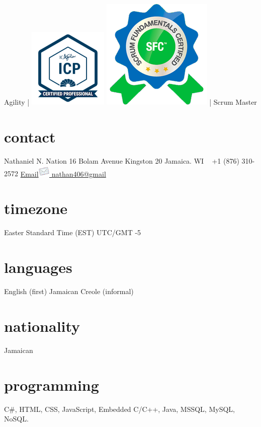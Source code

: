 \documentclass[]{friggeri-cvRS}
\begin{document}
       {Agility | \includegraphics[scale=0.1]{images/ICP.png} \includegraphics[scale=0.08]{images/sfc.png} | Scrum Master}


\begin{aside}
  \section{contact}
    Nathaniel N. Nation
   16 Bolam Avenue
   Kingston 20
    Jamaica. WI
    ~
    +1 (876) 310-2572
    \href{mailto:nathan406@gmail.com}{Email\includegraphics[height=16pt]{images/email.png}
    nathan406@gmail}
    \section{timezone}
    Easter Standard Time (EST)
    UTC/GMT -5
    \section{languages}
    English (first)
    Jamaican Creole (informal)
    \section{nationality}
    Jamaican
    \section{programming}
     C\#, HTML, CSS, JavaScript, Embedded C/C++, Java, MSSQL, MySQL, NoSQL.
\end{aside}
\end{document}
